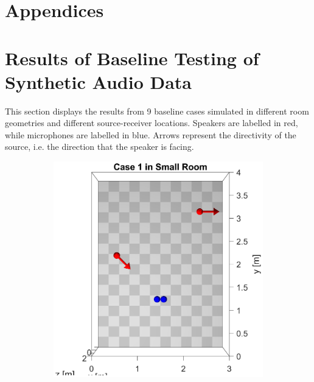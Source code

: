 \documentclass[a4paper,twoside,12pt,hidelinks]{article}
\begin{document}
\newpage
\lhead{\itshape\nouppercase{\leftmark}}
 

\newpage
{}
\begin{appendices}
\section*{Appendices}
\section{Results of Baseline Testing of Synthetic Audio Data}
\label{appendixresult}
This section displays the results from 9 baseline cases simulated in different room geometries and different source-receiver locations. Speakers are labelled in red, while microphones are labelled in blue. Arrows represent the directivity of the source, i.e. the direction that the speaker is facing.
\begin{figure}[H]
\centering	
\begin{subfigure}[H]{0.3\textwidth}
\includegraphics[width=\textwidth]{1s_lo}
\end{subfigure}
\begin{subfigure}[H]{0.55\textwidth}

\end{subfigure}
\end{figure}
\end{appendices}
\end{document}
